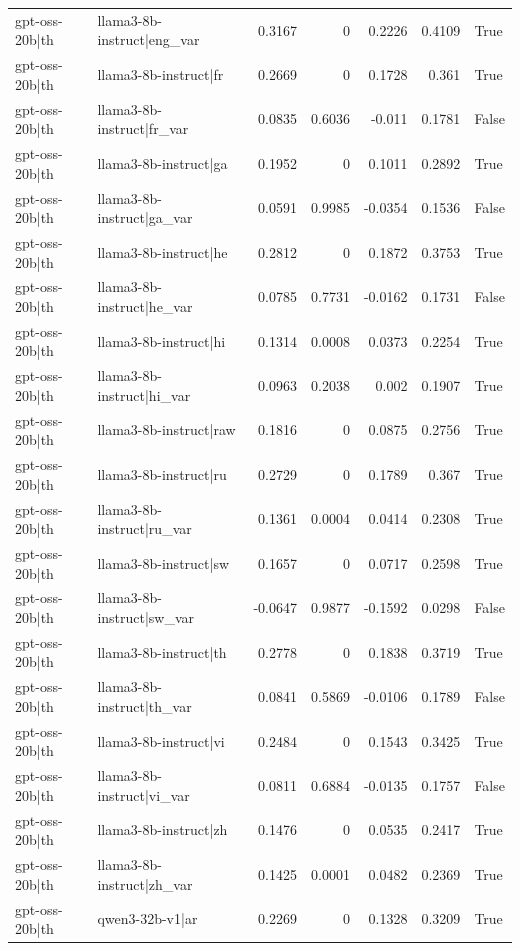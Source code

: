 \begin{table}
\begin{tabular}{l l r r r r l}
gpt-oss-20b|th & llama3-8b-instruct|eng_var & 0.3167 & 0 & 0.2226 & 0.4109 & True \\
gpt-oss-20b|th & llama3-8b-instruct|fr & 0.2669 & 0 & 0.1728 & 0.361 & True \\
gpt-oss-20b|th & llama3-8b-instruct|fr_var & 0.0835 & 0.6036 & -0.011 & 0.1781 & False \\
gpt-oss-20b|th & llama3-8b-instruct|ga & 0.1952 & 0 & 0.1011 & 0.2892 & True \\
gpt-oss-20b|th & llama3-8b-instruct|ga_var & 0.0591 & 0.9985 & -0.0354 & 0.1536 & False \\
gpt-oss-20b|th & llama3-8b-instruct|he & 0.2812 & 0 & 0.1872 & 0.3753 & True \\
gpt-oss-20b|th & llama3-8b-instruct|he_var & 0.0785 & 0.7731 & -0.0162 & 0.1731 & False \\
gpt-oss-20b|th & llama3-8b-instruct|hi & 0.1314 & 0.0008 & 0.0373 & 0.2254 & True \\
gpt-oss-20b|th & llama3-8b-instruct|hi_var & 0.0963 & 0.2038 & 0.002 & 0.1907 & True \\
gpt-oss-20b|th & llama3-8b-instruct|raw & 0.1816 & 0 & 0.0875 & 0.2756 & True \\
gpt-oss-20b|th & llama3-8b-instruct|ru & 0.2729 & 0 & 0.1789 & 0.367 & True \\
gpt-oss-20b|th & llama3-8b-instruct|ru_var & 0.1361 & 0.0004 & 0.0414 & 0.2308 & True \\
gpt-oss-20b|th & llama3-8b-instruct|sw & 0.1657 & 0 & 0.0717 & 0.2598 & True \\
gpt-oss-20b|th & llama3-8b-instruct|sw_var & -0.0647 & 0.9877 & -0.1592 & 0.0298 & False \\
gpt-oss-20b|th & llama3-8b-instruct|th & 0.2778 & 0 & 0.1838 & 0.3719 & True \\
gpt-oss-20b|th & llama3-8b-instruct|th_var & 0.0841 & 0.5869 & -0.0106 & 0.1789 & False \\
gpt-oss-20b|th & llama3-8b-instruct|vi & 0.2484 & 0 & 0.1543 & 0.3425 & True \\
gpt-oss-20b|th & llama3-8b-instruct|vi_var & 0.0811 & 0.6884 & -0.0135 & 0.1757 & False \\
gpt-oss-20b|th & llama3-8b-instruct|zh & 0.1476 & 0 & 0.0535 & 0.2417 & True \\
gpt-oss-20b|th & llama3-8b-instruct|zh_var & 0.1425 & 0.0001 & 0.0482 & 0.2369 & True \\
gpt-oss-20b|th & qwen3-32b-v1|ar & 0.2269 & 0 & 0.1328 & 0.3209 & True \\

\end{tabular}
\end{table}
